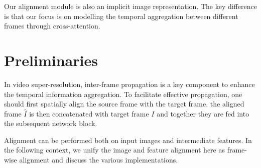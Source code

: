 \documentclass[10pt,twocolumn,letterpaper]{article}
\begin{document}
Our alignment module is also an implicit image representation.  The key difference is that our focus is on modelling the temporal aggregation between different frames through cross-attention.
 
\section{Preliminaries}\label{sec:preliminary}

In video super-resolution, inter-frame propagation is a key component to enhance the temporal information aggregation. To facilitate effective propagation, one should first spatially align the source frame with the target frame. the aligned frame $\hat{I}$ is then concatenated with target frame $I$ and together they are fed into the subsequent network block.



Alignment can be performed both on input images and intermediate features. In the following context, we unify the image and feature alignment here as frame-wise alignment and discuss the various implementations.
\end{document}
